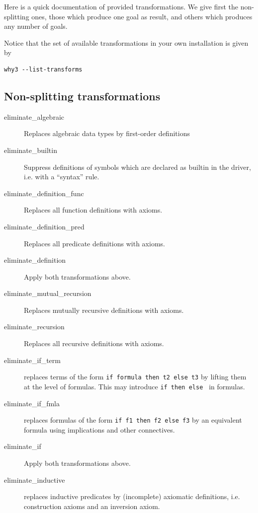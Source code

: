 Here is a quick documentation of provided transformations. We give
first the non-splitting ones, \eg{} those which produce one goal as
result, and others which produces any number of goals.

Notice that the set of available transformations in your own
installation is given by
\begin{verbatim}
why3 --list-transforms
\end{verbatim}

\subsection{Non-splitting transformations}

\begin{description}

\item[eliminate\_algebraic] Replaces algebraic data types by first-order
definitions~\cite{paskevich09rr}

\item[eliminate\_builtin] Suppress definitions of symbols which are
  declared as builtin in the driver, i.e. with a ``syntax'' rule.
\item[eliminate\_definition\_func]
  Replaces all function definitions with axioms.
\item[eliminate\_definition\_pred]
  Replaces all predicate definitions with axioms.
\item[eliminate\_definition]
  Apply both transformations above.
\item[eliminate\_mutual\_recursion]
  Replaces mutually recursive definitions with axioms.
\item[eliminate\_recursion]
  Replaces all recursive definitions with axioms.

\item[eliminate\_if\_term] replaces terms of the form \texttt{if
    formula then t2 else t3} by lifting them at the level of formulas.
  This may introduce \texttt{if then else } in formulas.

\item[eliminate\_if\_fmla] replaces formulas of the form \texttt{if f1 then f2
  else f3} by an equivalent formula using implications and other
  connectives.

\item[eliminate\_if]
  Apply both transformations above.

\item[eliminate\_inductive] replaces inductive predicates by
  (incomplete) axiomatic definitions, i.e. construction axioms and
  an inversion axiom.


\end{description}
